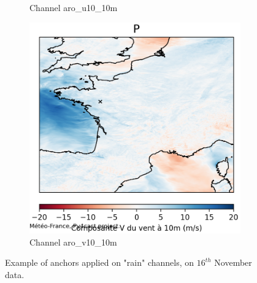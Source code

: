 \begin{figure}[h]
\begin{subfigure}[b]{0.49\textwidth}
        \caption{Channel aro\_u10\_10m}
    \end{subfigure}
    \hfill
    \begin{subfigure}[b]{0.49\textwidth}
        \includegraphics[width=\textwidth]{Images/titan_rain_anchors/nov-16/2023111600_feature_aro_v10_10m.png}
        \caption{Channel aro\_v10\_10m}
    \end{subfigure}
    \caption{Example of anchors applied on "rain" channels, on $16^{th}$ November data.}
    \label{fig:titan-rain-anchors-16}
\end{figure}

